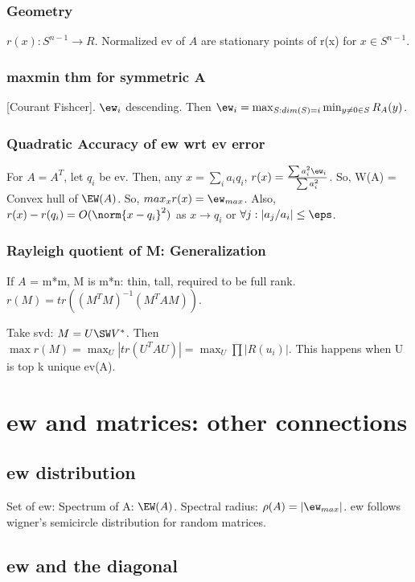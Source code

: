 \documentclass[oneside, article]{memoir}
\begin{document}
\subsubsection{Geometry}
$r(x):S^{n-1} \to R$. Normalized ev of $A$ are stationary points of r(x) for $x \in S^{n-1}$.

\subsubsection{maxmin thm for symmetric A}
[Courant Fishcer]. $\ew_i$ descending. Then $\ew_i = \max_{S:dim(S) = i} \min_{y \neq 0 \in S} R_A(y)$.


\subsubsection{Quadratic Accuracy of ew wrt ev error}
For $A = A^{T}$, let $q_{i}$ be ev. Then, any $x = \sum_{i} a_{i}q_{i}$, $r(x) = \frac{\sum a_{i}^{2}\ew_{i}}{\sum a_{i}^{2}}$. So, W(A) = Convex hull of $\EW(A)$. So, $max_{x}r(x) = \ew_{max}$. Also, $r(x) - r(q_{i}) = O(\norm{x-q_{i}}^{2})$ as $x \to q_{i}$ or $\forall j: |a_{j}/a_{i}| \leq \eps$.

\subsubsection{Rayleigh quotient of M: Generalization}
If $A$ = m*m, M is m*n: thin, tall, required to be full rank.\\
$r(M) = tr((M^{T}M)^{-1}(M^{T}AM))$.

Take svd: $M = U\SW V^{*}$. Then \\
$\max r(M) = \max_{U} |tr(U^{T}AU)| = \max_{U} \prod |R(u_{i})|$. This happens when U is top k unique ev(A).

\section{ew and matrices: other connections}
\subsection{ew distribution}
Set of ew: Spectrum of A: $\EW(A)$. Spectral radius: $\rho(A) = |\ew_{max}|$. ew follows wigner's semicircle distribution for random matrices. \why

\subsection{ew and the diagonal}
\end{document}
